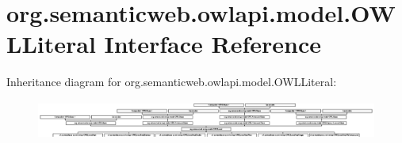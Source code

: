 \hypertarget{interfaceorg_1_1semanticweb_1_1owlapi_1_1model_1_1_o_w_l_literal}{\section{org.\-semanticweb.\-owlapi.\-model.\-O\-W\-L\-Literal Interface Reference}
\label{interfaceorg_1_1semanticweb_1_1owlapi_1_1model_1_1_o_w_l_literal}
}
Inheritance diagram for org.\-semanticweb.\-owlapi.\-model.\-O\-W\-L\-Literal\-:\begin{figure}[H]
\begin{center}
\leavevmode
\includegraphics[height=1.269841cm]{interfaceorg_1_1semanticweb_1_1owlapi_1_1model_1_1_o_w_l_literal}
\end{center}
\end{figure}
